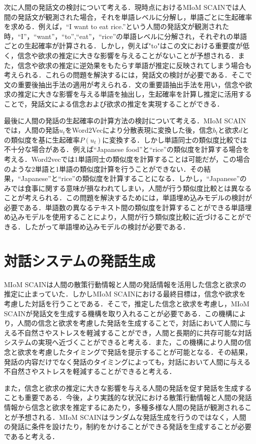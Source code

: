 \par
次に人間の発話文の検討について考える．現時点におけるMIoM SCAINでは人間の発話文が観測された場合，それを単語レベルに分解し，単語ごとに生起確率を求める．例えば，``I want to eat rice.''という人間の発話文が観測された時，``I''，``want''，``to'',``eat''，``rice''の単語レベルに分解され，それぞれの単語ごとの生起確率が計算される．しかし，例えば"to"はこの文における重要度が低く，信念や欲求の推定に大きな影響を与えることがないことが予想される．また，信念や欲求の推定に逆効果をもたらす単語が推定に反映されてしまう場合も考えられる．これらの問題を解決するには，発話文の検討が必要である．そこで文の重要後抽出手法の適用が考えられる．文の重要語抽出手法を用い，信念や欲求の推定に大きな影響を与える単語を抽出し，生起確率を計算し推定に活用することで，発話文による信念および欲求の推定を実現することができる．

\par
最後に人間の発話の生起確率の計算方法の検討について考える．MIoM SCAINでは，人間の発話$u_t$をWord2Vecにより分散表現に変換した後，信念$b_t$と欲求$d$との類似度を基に生起確率$P(u_t)$に変換する．しかし単語同士の類似度比較では不十分な場合がある．例えば``Japanese food''と``rice''の類似度を計算する場合を考える．Word2vecでは1単語同士の類似度を計算することは可能だが，この場合のような2単語と1単語の類似度計算を行うことができない．その結果，``Japanese''と``rice''の類似度を計算することになる．しかし，``Japanese''のみでは食事に関する意味が損なわれてしまい，人間が行う類似度比較とは異なることが考えられる．この問題を解決するためには，単語埋め込みモデルの検討が必要である．単語数の異なるテキスト間の類似度を計算することができる単語埋め込みモデルを使用することにより，人間が行う類似度比較に近づけることができる．したがって単語埋め込みモデルの検討が必要である．


\section{対話システムの発話生成}

\par
MIoM SCAINは人間の散策行動情報と人間の発話情報を活用した信念と欲求の推定に止まっていた．しかしMIoM SCAINにおける最終目標は，信念や欲求を考慮した対話を行うことである．そこで，推定した信念と欲求を考慮し，MIoM SCAINが発話文を生成する機構を取り入れることが必要である．この機構により，人間の信念と欲求を考慮した発話を生成することで，対話において人間に与える不自然さやストレスを軽減することができ，人間と長期的に共存可能な対話システムの実現へ近づくことができると考える．また，この機構により人間の信念と欲求を考慮したタイミングで発話を提示することが可能となる．その結果，発話の内容だけでなく発話のタイミングによっても，対話において人間に与える不自然さやストレスを軽減することができると考える．

\par
また，信念と欲求の推定に大きな影響を与える人間の発話を促す発話を生成することも重要である．今後，より実践的な状況における散策行動情報と人間の発話情報から信念と欲求を推定するにあたり，多種多様な人間の発話が観測されることが予想される．MIoM SCAINはランダムな発話生成を行うのではなく，人間の発話に条件を設けたり，制約をかけることができる発話を生成することが必要であると考える．
